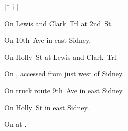 
[$\ast\dagger$]

\begin{LocationList}

On   Lewis and Clark~Trl at 2nd~St.

On 10th~Ave in east Sidney.

On Holly~St at   Lewis and Clark~Trl.

On , accessed from  just west of Sidney.

On truck route  9th~Ave in east Sidney.

On  Holly~St in east Sidney.

\Location{\TruckStop \Gas \Rest \Service}
On   at .

\end{LocationList}
